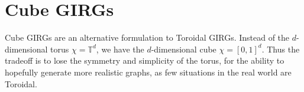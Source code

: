 










\section{Cube GIRGs}

Cube GIRGs are an alternative formulation to Toroidal GIRGs. Instead of the $d$-dimensional torus $\chi = \mathbb{T}^d$, we have the $d$-dimensional cube $\chi = [0,1]^d$. Thus the tradeoff is to lose the symmetry and simplicity of the torus, for the ability to hopefully generate more realistic graphs, as few situations in the real world are Toroidal.

